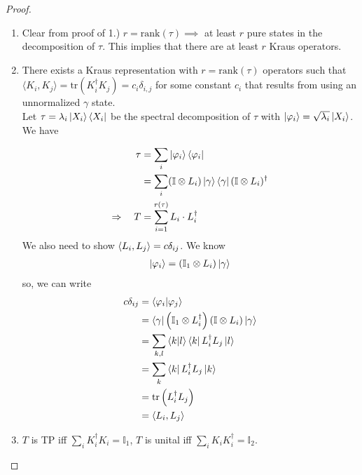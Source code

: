 \documentclass[10pt,oneside,longbibliography]{report}
\begin{document}
\begin{tcolorbox}[colframe=black,breakable, colback=black!5, arc=0pt, outer arc=0pt,boxrule=0.5pt]
\begin{proof}
\begin{enumerate}
    
    
    \item Clear from proof of 1.) $r=\text{rank}(\tau) \implies$ at least $r$ pure states in the decomposition of $\tau$. This implies that there are at least $r$ Kraus operators. 
    \item There exists a Kraus representation with $r=\text{rank}(\tau)$ operators such that $\langle K_i,K_j\rangle=\text{tr}(K_i^{\dagger} K_j) = c_i \delta_{i,j}$ for some constant $c_i$ that results from using an unnormalized $\gamma$ state. \\
    
    Let $\tau = \lambda_i \ket{X_i} \bra{X_i}$ be the spectral decomposition of $\tau$ with $\ket{\varphi_i}=\sqrt{\lambda_i} \ket{X_i}$. We have
    
    \begin{align}
        \tau &= \sum_i \ket{\varphi_i}\bra{\varphi_i} \\
        &=\sum_i (\mathbb{I} \otimes L_i) \ket{\gamma}\bra{\gamma} (\mathbb{I}\otimes L_i)^{\dagger} \\
        \Rightarrow \quad  T &= \sum_{i=1}^{r(\tau)}L_i \cdot L_i^{\dagger}
    \end{align}
    We also need to show $\braket{L_i,L_j}=c \delta_{ij}$. We know
    \begin{align}
       \ket{\varphi_i} = (\mathbb{I}_1 \otimes L_i)\ket{\gamma}
    \end{align}
    so, we can write
    \begin{align}
      c\delta_{ij} &=\braket{\varphi_i|\varphi_j}\\
      &= \bra{\gamma}\left(\mathbb{I}_1 \otimes L_i^{\dagger}\right)\left(\mathbb{I}\otimes L_i\right)\ket{\gamma} \\
        &= \sum_{k,l} \braket{k|l} \bra{k}L_i^{\dagger} L_j \ket{l}\\
        &= \sum_k  \bra{k} L_i^{\dagger}L_j \ket{k} \\
        &= \text{tr}\left(L_i^{\dagger} L_j\right)\\
        &= \braket{L_i,L_j}
    \end{align}
    
    \item $T$ is TP iff $\sum_i K_i^{\dagger}K_i = \mathbb{I}_1$, $T$ is unital iff $\sum_i K_i K_i^{\dagger} = \mathbb{I}_2$.
    

\end{enumerate}
\end{proof}
\end{tcolorbox}
\end{document}
